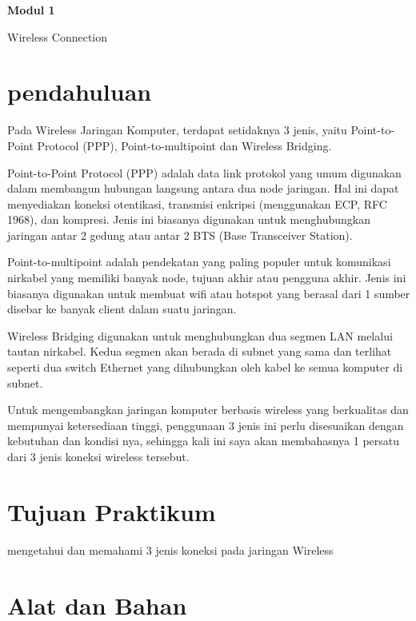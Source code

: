 \newpage
\setcounter{section}{0}
\renewcommand{\thesection}{\arabic{section}}

\begin{center}
    \Huge
    \textbf{Modul 1}
    
    Wireless Connection

\end{center}

\section{pendahuluan}

Pada Wireless Jaringan Komputer, terdapat setidaknya 3 jenis, yaitu Point-to-Point Protocol
(PPP), Point-to-multipoint dan Wireless Bridging.

Point-to-Point Protocol (PPP) adalah data link protokol yang umum digunakan dalam
membangun hubungan langsung antara dua node jaringan. Hal ini dapat menyediakan koneksi
otentikasi, transmisi enkripsi (menggunakan ECP, RFC 1968), dan kompresi. Jenis ini
biasanya digunakan untuk menghubungkan jaringan antar 2 gedung atau antar 2 BTS (Base
Transceiver Station).

Point-to-multipoint adalah pendekatan yang paling populer untuk komunikasi nirkabel yang
memiliki banyak node, tujuan akhir atau pengguna akhir. Jenis ini biasanya digunakan untuk
membuat wifi atau hotspot yang berasal dari 1 sumber disebar ke banyak client dalam suatu
jaringan.

Wireless Bridging digunakan untuk menghubungkan dua segmen LAN melalui tautan
nirkabel. Kedua segmen akan berada di subnet yang sama dan terlihat seperti dua switch
Ethernet yang dihubungkan oleh kabel ke semua komputer di subnet.

Untuk mengembangkan jaringan komputer berbasis wireless yang berkualitas dan mempunyai
ketersediaan tinggi, penggunaan 3 jenis ini perlu disesuaikan dengan kebutuhan dan kondisi
nya, sehingga kali ini saya akan membahasnya 1 persatu dari 3 jenis koneksi wireless
tersebut.

\section{Tujuan Praktikum}

mengetahui dan memahami 3 jenis koneksi pada jaringan Wireless

\section{Alat dan Bahan}

